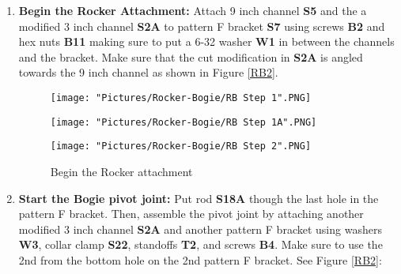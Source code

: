 \documentclass[12pt]{article}
\begin{document}
\begin{enumerate}
\item \textbf{Begin the Rocker Attachment:}  Attach 9 inch channel \textbf{S5} and the a modified 3 inch channel \textbf{S2A} to pattern F bracket \textbf{S7} using screws \textbf{B2} and hex nuts \textbf{B11} making sure to put a 6-32 washer \textbf{W1} in between the channels and the bracket. Make sure that the cut modification in \textbf{S2A} is angled towards the 9 inch channel as shown in Figure \ref {RB2}.

\begin{figure}[H]
  	\centering
  	\begin{minipage}[b]{0.30\textwidth}
    		\texttt{[image: "Pictures/Rocker-Bogie/RB Step 1".PNG]}
  	\end{minipage}
  	\hfill
  	\begin{minipage}[b]{0.30\textwidth}
    		\texttt{[image: "Pictures/Rocker-Bogie/RB Step 1A".PNG]}
  	\end{minipage}
    	\hfill
  	\begin{minipage}[b]{0.30\textwidth}
    		\texttt{[image: "Pictures/Rocker-Bogie/RB Step 2".PNG]}
  	\end{minipage}
  	\caption{Begin the Rocker attachment}
\end{figure}



\item \textbf{Start the Bogie pivot joint:} Put rod \textbf{S18A} though the last hole in the pattern F bracket. Then,  assemble the pivot joint by attaching another modified 3 inch channel \textbf{S2A} and another pattern F bracket using washers \textbf{W3}, collar clamp \textbf{S22}, standoffs \textbf{T2}, and screws \textbf{B4}. Make sure to use the 2nd from the bottom hole on the 2nd pattern F bracket. See Figure \ref{RB2}:



\end{enumerate}
\end{document}
